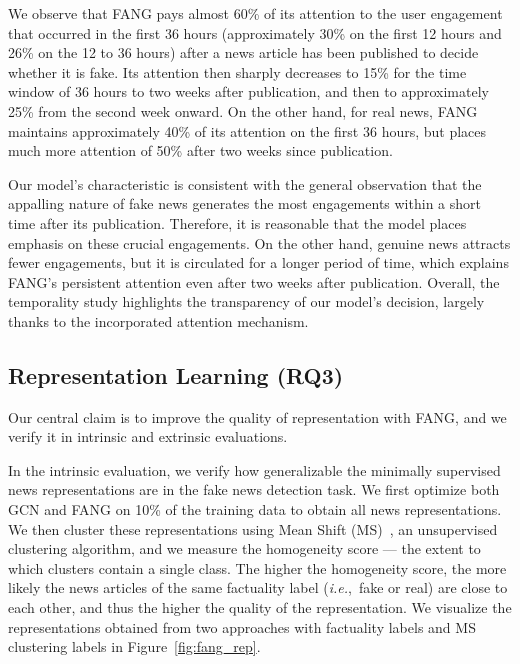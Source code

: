 \documentclass[sigconf,anonymous]{acmart}
\theoremstyle{definition}
\theoremstyle{hypothesis}
\begin{document}
We observe that FANG pays almost 60\% of its attention to the user engagement that occurred in the first 36 hours (approximately 30\% on the first 12 hours and 26\% on the 12 to 36 hours) after a news article has been published to decide whether it is fake. Its attention then sharply decreases to 15\% for the time window of 36 hours to two weeks after publication, and then to approximately 25\% from the second week onward. On the other hand, for real news, FANG maintains approximately 40\% of its attention on the first 36 hours, but places much more attention of 50\% after two weeks since publication. 

Our model's characteristic is consistent with the general observation that the appalling nature of fake news generates the most engagements within a short time after its publication. Therefore, it is reasonable that the model places emphasis on these crucial engagements. On the other hand, genuine news attracts fewer engagements, but it is circulated for a longer period of time, which explains FANG's persistent attention even after two weeks after publication. Overall, the temporality study highlights the transparency of our model's decision, largely thanks to the incorporated attention mechanism. 

\subsection{Representation Learning (RQ3)}

Our central claim is to improve the quality of representation with FANG, and we verify it in intrinsic and extrinsic evaluations. 

In the intrinsic evaluation, we verify how generalizable the minimally supervised news representations are in the fake news detection task. We first optimize both GCN and FANG on 10\% of the training data to obtain all news representations. We then cluster these representations using Mean Shift (MS)~\cite{Comaniciu2002meanshift}, an unsupervised clustering algorithm, and we measure the homogeneity score --- the extent to which clusters contain a single class. 
The higher the homogeneity score, the more likely the news articles of the same factuality label (\textit{i.e.},~fake or real) are close to each other, and thus the higher the quality of the representation. 
We visualize the representations obtained from two approaches with factuality labels and MS clustering labels in Figure~\ref{fig:fang_rep}.
\end{document}
